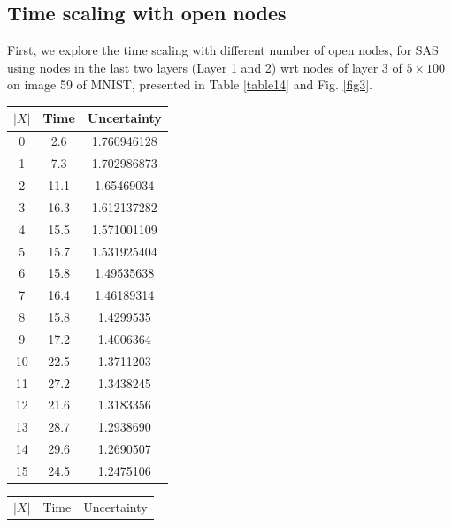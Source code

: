 \subsection*{Time scaling with open nodes}	

First, we explore the time scaling with different number of open nodes, for SAS using nodes in the last two layers (Layer 1 and 2) wrt nodes of layer 3 of $5\times 100$ on image 59 of MNIST, presented in Table \ref{table14} and Fig. \ref{fig3}.





\begin{table}[t!]
		\centering
		\hspace*{4ex}
		\begin{subtable}[b]{0.45\textwidth}
		\begin{tabular}{|c|c|c|}
		\hline
		$|X|$ & Time & Uncertainty\\ 
		\hline	0 & 2.6 & 1.760946128\\
		\hline	1 & 7.3 & 1.702986873\\
		\hline	2 & 11.1 & 1.65469034\\
		\hline	3 & 16.3 & 1.612137282\\
		\hline	4 & 15.5 & 1.571001109\\
		\hline	5 & 15.7 & 1.531925404\\
		\hline	6 & 15.8 & 1.49535638\\
		\hline	7 & 16.4 & 1.46189314\\
		\hline	8 &  15.8 & 1.4299535\\
		\hline	9 &  17.2 & 1.4006364\\
		\hline	10 & 22.5 & 1.3711203\\
		\hline	11 & 27.2 & 1.3438245\\
		\hline	12 & 21.6 & 1.3183356\\
		\hline	13 & 28.7 & 1.2938690\\
		\hline	14 & 29.6 & 1.2690507\\
		\hline	15 & 24.5 & 1.2475106\\
		\hline
	  \end{tabular}
	\end{subtable}
	\hfill
	\begin{subtable}[b]{0.45\textwidth}
		\begin{tabular}{|c|c|c|}
			\hline
			$|X|$ & Time & Uncertainty\\ 

\end{tabular}
\end{subtable}
\end{table}
